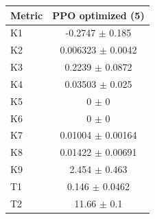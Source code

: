 \begin{tabular}{lc}
\toprule
Metric & PPO optimized (5) \\
\midrule
K1 & -0.2747 $\pm$ 0.185 \\
K2 & 0.006323 $\pm$ 0.0042 \\
K3 & 0.2239 $\pm$ 0.0872 \\
K4 & 0.03503 $\pm$ 0.025 \\
K5 & 0 $\pm$ 0 \\
K6 & 0 $\pm$ 0 \\
K7 & 0.01004 $\pm$ 0.00164 \\
K8 & 0.01422 $\pm$ 0.00691 \\
K9 & 2.454 $\pm$ 0.463 \\
T1 & 0.146 $\pm$ 0.0462 \\
T2 & 11.66 $\pm$ 0.1 \\
\bottomrule
\end{tabular}
